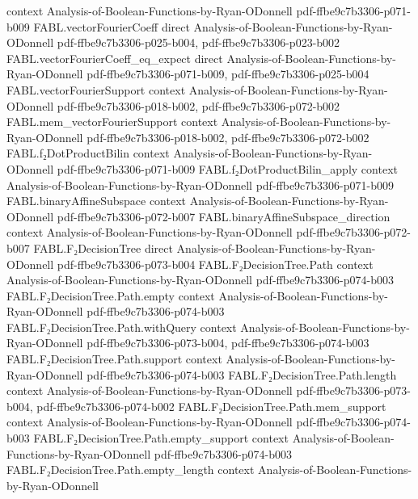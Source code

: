 \begin{theorem}
  {context}
  {Analysis-of-Boolean-Functions-by-Ryan-ODonnell}
  {pdf-ffbe9c7b3306-p071-b009}
\proofstep
  {FABL.vectorFourierCoeff}
  {direct}
  {Analysis-of-Boolean-Functions-by-Ryan-ODonnell}
  {pdf-ffbe9c7b3306-p025-b004,
    pdf-ffbe9c7b3306-p023-b002}
\proofstep
  {FABL.vectorFourierCoeff_eq_expect}
  {direct}
  {Analysis-of-Boolean-Functions-by-Ryan-ODonnell}
  {pdf-ffbe9c7b3306-p071-b009,
    pdf-ffbe9c7b3306-p025-b004}
\proofstep
  {FABL.vectorFourierSupport}
  {context}
  {Analysis-of-Boolean-Functions-by-Ryan-ODonnell}
  {pdf-ffbe9c7b3306-p018-b002,
    pdf-ffbe9c7b3306-p072-b002}
\proofstep
  {FABL.mem_vectorFourierSupport}
  {context}
  {Analysis-of-Boolean-Functions-by-Ryan-ODonnell}
  {pdf-ffbe9c7b3306-p018-b002,
    pdf-ffbe9c7b3306-p072-b002}
\proofstep
  {FABL.f₂DotProductBilin}
  {context}
  {Analysis-of-Boolean-Functions-by-Ryan-ODonnell}
  {pdf-ffbe9c7b3306-p071-b009}
\proofstep
  {FABL.f₂DotProductBilin_apply}
  {context}
  {Analysis-of-Boolean-Functions-by-Ryan-ODonnell}
  {pdf-ffbe9c7b3306-p071-b009}
\proofstep
  {FABL.binaryAffineSubspace}
  {context}
  {Analysis-of-Boolean-Functions-by-Ryan-ODonnell}
  {pdf-ffbe9c7b3306-p072-b007}
\proofstep
  {FABL.binaryAffineSubspace_direction}
  {context}
  {Analysis-of-Boolean-Functions-by-Ryan-ODonnell}
  {pdf-ffbe9c7b3306-p072-b007}
\proofstep
  {FABL.F₂DecisionTree}
  {direct}
  {Analysis-of-Boolean-Functions-by-Ryan-ODonnell}
  {pdf-ffbe9c7b3306-p073-b004}
\proofstep
  {FABL.F₂DecisionTree.Path}
  {context}
  {Analysis-of-Boolean-Functions-by-Ryan-ODonnell}
  {pdf-ffbe9c7b3306-p074-b003}
\proofstep
  {FABL.F₂DecisionTree.Path.empty}
  {context}
  {Analysis-of-Boolean-Functions-by-Ryan-ODonnell}
  {pdf-ffbe9c7b3306-p074-b003}
\proofstep
  {FABL.F₂DecisionTree.Path.withQuery}
  {context}
  {Analysis-of-Boolean-Functions-by-Ryan-ODonnell}
  {pdf-ffbe9c7b3306-p073-b004,
    pdf-ffbe9c7b3306-p074-b003}
\proofstep
  {FABL.F₂DecisionTree.Path.support}
  {context}
  {Analysis-of-Boolean-Functions-by-Ryan-ODonnell}
  {pdf-ffbe9c7b3306-p074-b003}
\proofstep
  {FABL.F₂DecisionTree.Path.length}
  {context}
  {Analysis-of-Boolean-Functions-by-Ryan-ODonnell}
  {pdf-ffbe9c7b3306-p073-b004,
    pdf-ffbe9c7b3306-p074-b002}
\proofstep
  {FABL.F₂DecisionTree.Path.mem_support}
  {context}
  {Analysis-of-Boolean-Functions-by-Ryan-ODonnell}
  {pdf-ffbe9c7b3306-p074-b003}
\proofstep
  {FABL.F₂DecisionTree.Path.empty_support}
  {context}
  {Analysis-of-Boolean-Functions-by-Ryan-ODonnell}
  {pdf-ffbe9c7b3306-p074-b003}
\proofstep
  {FABL.F₂DecisionTree.Path.empty_length}
  {context}
  {Analysis-of-Boolean-Functions-by-Ryan-ODonnell}

\end{theorem}
